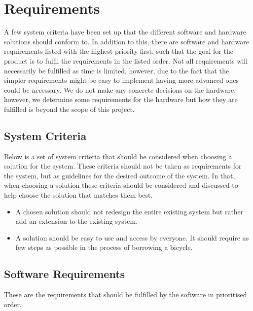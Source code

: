 \section{Requirements}
A few system criteria have been set up that the different software and hardware solutions should conform to. 
In addition to this, there are software and hardware requirements listed with the highest priority first, such that the goal for the product is to fulfil the requirements in the listed order. 
Not all requirements will necessarily be fulfilled as time is limited, however, due to the fact that the simpler requirements might be easy to implement having more advanced ones could be necessary.
We do not make any concrete decisions on the hardware, however, we determine some requirements for the hardware but how they are fulfilled is beyond the scope of this project.

\subsection{System Criteria}\label{sec:systemCriteria}
Below is a set of system criteria that should be considered when choosing a solution for the system.
These criteria should not be taken as requirements for the system, but as guidelines for the desired outcome of the system.
In that, when choosing a solution these criteria should be considered and discussed to help choose the solution that matches them best.

\begin{itemize}
	\item A chosen solution should not redesign the entire existing system but rather add an extension to the existing system.
	\item A solution should be easy to use and access by everyone. 
	It should require as few steps as possible in the process of borrowing a bicycle.
\end{itemize}

\subsection{Software Requirements}
These are the requirements that should be fulfilled by the software in prioritised order.

